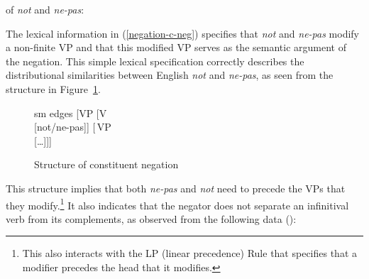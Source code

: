 \documentclass[output=paper
	        ,collection
	        ,collectionchapter
 	        ,biblatex
                ,babelshorthands
                ,newtxmath
                ,draftmode
                ,colorlinks, citecolor=brown
]{langscibook}
\begin{document}
\begin{exe}
\begin{xlist}
\begin{exe}
\begin{xlist}
\ea
\label{negation-c-neg}
\localvs of \emph{not} and \emph{ne-pas}:\\
\z


\noindent %
The lexical information in (\ref{negation-c-neg}) specifies that
\textit{not} and \textit{ne-pas} modify a non-finite VP and that this
modified VP serves as the semantic argument of the negation.
This simple lexical specification correctly describes the
distributional similarities between English \textit{not} and 
\textit{ne-pas}, as seen from the structure in Figure~\ref{negation-not-vp-mod}.

\begin{figure}
	\begin{forest}
		sm edges
		[VP
			[V\\
					[not/ne-pas]]
			[\,VP\\
					[\ldots]]]
	\end{forest}
\caption{Structure of constituent negation}\label{negation-not-vp-mod}
\end{figure}
\noindent
This structure implies that
both \textit{ne-pas} and \textit{not} need to precede the VPs that they modify.\footnote{
This also interacts with the LP (linear precedence) Rule that specifies
that a modifier precedes the head that it modifies.}  It also
indicates that the negator does not separate an infinitival verb
from its complements, as observed from the following data (\citealp[]{KS:02}):

\eal
{} \label{negation-35a}
 \label{negation-35b}
\zl

\eal
{} \label{negation-34a}
 \label{negation-34b}
\zl




\end{xlist}
\end{exe}
\end{xlist}
\end{exe}
\end{document}
